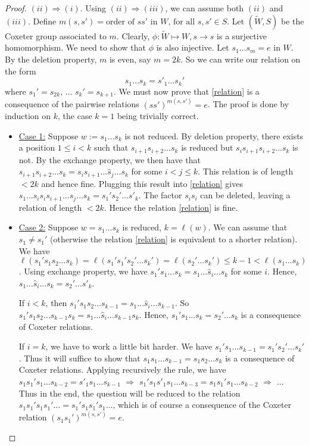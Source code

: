 \begin{proof}
$(ii) \Rightarrow (i)$. Using $(ii) \Rightarrow (iii)$, we can assume both $(ii)$ and $(iii)$. Define $m(s,s') = \text{order of $ss'$ in $W$, for all $s,s' \in S$}$. Let $(\tilde{W}, S)$ be the Coxeter group associated to $m$. Clearly, $\phi: \tilde{W} \mapsto W, s \to s$ is a surjective homomorphism. We need to show that $\phi$ is also injective. Let $s_1 \ldots s_m = e$ in $W$. By the deletion property, $m$ is even, say $m=2k$. So we can write our relation on the form
\begin{equation}
s_1 \ldots s_k = s'_1 \ldots s_k'
\label{relation}
\end{equation} where $s_1' = s_{2k}$, $\ldots$ $s_k' = s_{k+1}$. We must now prove that \eqref{relation} is a consequence of the pairwise relations $(ss')^{m(s,s')} = e$. The proof is done by induction on $k$, the case $k = 1$ being trivially correct.
\begin{itemize}
\item \underline{Case 1:} Suppose $w := s_1 \ldots s_k$ is not reduced. By deletion property, there exists a position $1 \le i <k$ such that $s_{i+1} s_{i+2} \ldots s_k$ is reduced but $s_i s_{i+1} s_{i+2} ...s_k$ is not. By the exchange property, we then have that $s_{i+1} s_{i+2} \ldots s_k = s_i s_{i+1} \ldots \hat{s}_j \ldots s_k$ for some $i < j \le k$. This relation is of length $<2k$ and hence fine. Plugging this result into \eqref{relation} gives $s_1 \ldots s_i s_i s_{i+1} \ldots \hat{s}_j \ldots s_k = s_1' s_2' \ldots s'_k$. The factor $s_i s_i$ can be deleted, leaving a relation of length $<2k$. Hence the relation \eqref{relation} is fine.
\item \underline{Case 2:} Suppose $w = s_1 \ldots s_k$ is reduced, $k = \ell (w)$. We can assume that $s_1 \neq s_1'$ (otherwise the relation \eqref{relation} is equivalent to a shorter relation). We have $\ell (s_1' s_1 s_2 \ldots s_k) = \ell (s_1' s_1' s_2' \ldots s_k') = \ell( s_2' \ldots s_k')  \le k-1 < \ell (s_1 \ldots s_k)$. Using exchange property, we have $s_1' s_1 \ldots s_k = s_1 \ldots \hat{s}_i \ldots s_k$ for some $i$. Hence, $s_1 \ldots \hat{s}_i \ldots s_k = s_2' \ldots s'_k$.

If $i<k$, then $s_1' s_1 s_2 \ldots s_{k-1} = s_1 \ldots \hat{s}_i \ldots s_{k-1}$. So $s_1' s_1 s_2 \ldots s_{k-1} s_k = s_1 \ldots \hat{s}_i \ldots s_{k-1} s_k$. Hence, $s_1' s_1 \ldots s_k = s_2' \ldots s_k$ is a consequence of Coxeter relations.

If $i=k$, we have to work a little bit harder. We have $s_1' s_1 \ldots s_{k-1} = s_1' s_2' \ldots s_k' $. Thus it will suffice to show that $s_1 s_1 \ldots s_{k-1} = s_1 s_2 \ldots s_k$ is a consequence of Coxeter relations. Applying recursively the rule, we have $s_1 s_1' s_1 \ldots s_{k-2} = s'_1 s_1 \ldots s_{k-1}$ $\Rightarrow$ $s_1' s_1 s'_1 s_1 \ldots s_{k-3} = s_1 s_1' s_1 \ldots s_{k-2}$ $\Rightarrow$ $\ldots$ Thus in the end, the question will be reduced to the relation $s_1 s_1' s_1 s_1' \ldots = s_1' s_1 s_1' s_1 \ldots$, which is of course a consequence of the Coxeter relation $(s_1 s_1')^{m(s,s')}= e$.


\end{itemize}

\end{proof}


